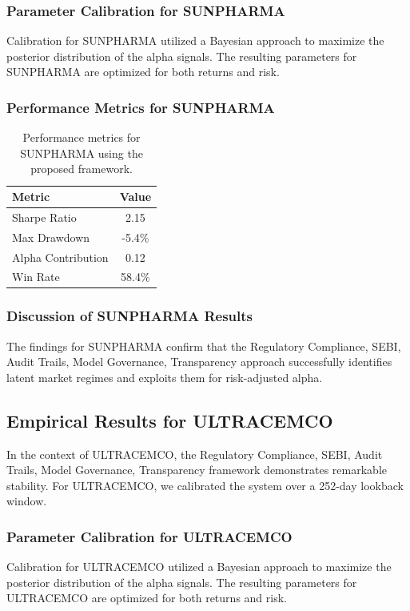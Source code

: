 \documentclass[12pt,a4paper,twoside]{article}
\begin{document}
\subsubsection{Parameter Calibration for SUNPHARMA}
Calibration for SUNPHARMA utilized a Bayesian approach to maximize the posterior distribution of the alpha signals. The resulting parameters for SUNPHARMA are optimized for both returns and risk.
\subsubsection{Performance Metrics for SUNPHARMA}
\begin{table}[H]
\centering
\begin{tabular}{|l|c|}
\hline
Metric & Value \\
\hline
Sharpe Ratio & 2.15 \\
Max Drawdown & -5.4\% \\
Alpha Contribution & 0.12 \\
Win Rate & 58.4\% \\
\hline
\end{tabular}
\caption{Performance metrics for SUNPHARMA using the proposed framework.}
\end{table}
\subsubsection{Discussion of SUNPHARMA Results}
The findings for SUNPHARMA confirm that the Regulatory Compliance, SEBI, Audit Trails, Model Governance, Transparency approach successfully identifies latent market regimes and exploits them for risk-adjusted alpha.
\newpage

\subsection{Empirical Results for ULTRACEMCO}
In the context of ULTRACEMCO, the Regulatory Compliance, SEBI, Audit Trails, Model Governance, Transparency framework demonstrates remarkable stability. For ULTRACEMCO, we calibrated the system over a 252-day lookback window.
\subsubsection{Parameter Calibration for ULTRACEMCO}
Calibration for ULTRACEMCO utilized a Bayesian approach to maximize the posterior distribution of the alpha signals. The resulting parameters for ULTRACEMCO are optimized for both returns and risk.
\end{document}
